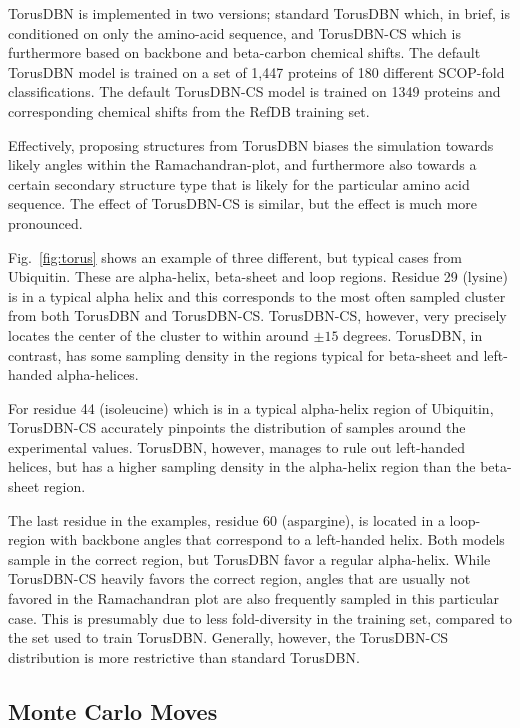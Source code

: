 TorusDBN is implemented in two versions;
standard TorusDBN which, in brief, is conditioned on only the amino-acid sequence, and TorusDBN-CS which is furthermore based on backbone and beta-carbon chemical shifts.
The default TorusDBN model is trained on a set of 1,447 proteins of 180 different SCOP-fold classifications. 
The default TorusDBN-CS model is trained on 1349 proteins and corresponding chemical shifts from the RefDB training set.

Effectively, proposing structures from TorusDBN biases the simulation towards likely angles within the Ramachandran-plot, and furthermore also towards a certain secondary structure type that is likely for the particular amino acid sequence.
The effect of TorusDBN-CS is similar, but the effect is much more pronounced.

Fig.~\ref{fig:torus} shows an example of three different, but typical cases from Ubiquitin. These are alpha-helix, beta-sheet and loop regions.
Residue 29 (lysine) is in a typical alpha helix and this corresponds to the most often sampled cluster from both TorusDBN and TorusDBN-CS. TorusDBN-CS, however, very precisely locates the center of the cluster to within around $\pm 15$ degrees. TorusDBN, in contrast, has some sampling density in the regions typical for beta-sheet and left-handed alpha-helices.

For residue 44 (isoleucine) which is in a typical alpha-helix region of Ubiquitin, TorusDBN-CS accurately pinpoints the distribution of samples around the experimental values.
TorusDBN, however, manages to rule out left-handed helices, but has a higher sampling density in the alpha-helix region than the beta-sheet region. 

The last residue in the examples, residue 60 (aspargine), is located in a loop-region with backbone angles that correspond to a left-handed helix.
Both models sample in the correct region, but TorusDBN favor a regular alpha-helix.
While TorusDBN-CS heavily favors the correct region, angles that are usually not favored in the Ramachandran plot are also frequently sampled in this particular case.
This is presumably due to less fold-diversity in the training set, compared to the set used to train TorusDBN. Generally, however, the TorusDBN-CS distribution is more restrictive than standard TorusDBN.
\subsection{Monte Carlo Moves}



